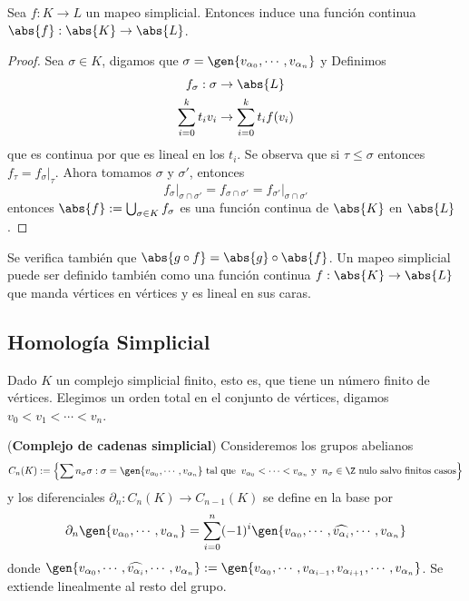\documentclass{article}
\begin{document}
\vspace{2mm}
\begin{lema}
    Sea $f:K\to L$ un mapeo simplicial. Entonces induce una función continua 
    $\abs{f}:\abs{K}\to\abs{L}$.
\end{lema}
\begin{proof}
    Sea $\sigma\in K$, digamos que $\sigma=\gen{v_{\alpha_{0}},\cdots,v_{\alpha_{n}}}$ y Definimos
    \begin{align*}
        f_{\sigma}:\sigma &\to \abs{L} \\
        \sum_{i=0}^{k}t_{i}v_{i} &\to \sum_{i=0}^{k}t_{i}f(v_{i})
    \end{align*}
    que es continua por que es lineal en los $t_{i}$. Se observa que si $\tau\leq\sigma$ entonces
    $f_{\tau}=f_{\sigma}\big|_{\tau}$. Ahora tomamos $\sigma$ y $\sigma'$, entonces
    \begin{equation*}
        f_{\sigma}\big|_{\sigma\cap\sigma'}=f_{\sigma\cap\sigma'}
        =f_{\sigma'}\big|_{\sigma\cap\sigma'}
    \end{equation*}
    entonces $\abs{f}:=\bigcup_{\sigma\in K}f_{\sigma}$ es una función continua de $\abs{K}$ en 
    $\abs{L}$.
\end{proof}
\noindent Se verifica también que $\abs{g\circ f}=\abs{g}\circ\abs{f}$. Un mapeo simplicial puede
ser definido también como una función continua $f:\abs{K}\to\abs{L}$ que manda vértices en
vértices y es lineal en sus caras.

\newpage
\subsection{Homología Simplicial}
\noindent Dado $K$ un complejo simplicial finito, esto es, que tiene un número finito de vértices. 
Elegimos un orden total en el conjunto de vértices, digamos $v_{0}<v_{1}<\cdots<v_{n}$.

\vspace{2mm}
\begin{dfn}
    (\textbf{Complejo de cadenas simplicial}) Consideremos los grupos abelianos
    \begin{equation*}
        C_{n}(K):=\left\{\sum n_{\sigma}\sigma:\sigma=\gen{v_{\alpha_{0}},\cdots,v_{\alpha_{n}}}
        \text{ tal que}\hspace{2mm}v_{\alpha_{0}}<\cdots<v_{\alpha_{n}}
        \text{ y}\hspace{2mm}n_{\sigma}\in\Z
        \text{ nulo salvo finitos casos}\right\}
    \end{equation*}
    y los diferenciales $\partial_{n}:C_{n}(K)\to C_{n-1}(K)$ se define en la base por
    \begin{equation*}
        \partial_{n}\gen{v_{\alpha_{0}},\cdots,v_{\alpha_{n}}}
        =\sum_{i=0}^{n}(-1)^{i}\gen{v_{\alpha_{0}},\cdots,\widehat{v_{\alpha_{i}}},
        \cdots,v_{\alpha_{n}}}
    \end{equation*}
    donde $\gen{v_{\alpha_{0}},\cdots,\widehat{v_{\alpha_{i}}},\cdots,v_{\alpha_{n}}}:=
    \gen{v_{\alpha_{0}},\cdots,v_{\alpha_{i-1}},v_{\alpha_{i+1}},\cdots,v_{\alpha_{n}}}$. Se 
    extiende linealmente al resto del grupo.
\end{dfn}
\end{document}
